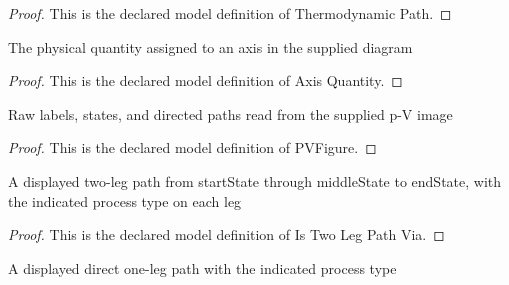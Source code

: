 \begin{proof}
  This is the declared model definition of Thermodynamic Path.
\end{proof}
\begin{definition}
  \label{def:physics:phyx-mini-0340:phyxminiproblems-problemphyxmini0340-axisquantity}
  The physical quantity assigned to an axis in the supplied diagram
\end{definition}
\begin{proof}
  This is the declared model definition of Axis Quantity.
\end{proof}
\begin{definition}[PVFigure]
  \label{def:physics:phyx-mini-0340:phyxminiproblems-problemphyxmini0340-pvfigure}
  Raw labels, states, and directed paths read from the supplied p-V image
\end{definition}
\begin{proof}
  This is the declared model definition of PVFigure.
\end{proof}
\begin{definition}
  \label{def:physics:phyx-mini-0340:phyxminiproblems-problemphyxmini0340-istwolegpathvia}
  A displayed two-leg path from startState through middleState to endState, with the indicated process type on each leg
\end{definition}
\begin{proof}
  This is the declared model definition of Is Two Leg Path Via.
\end{proof}
\begin{definition}
  \label{def:physics:phyx-mini-0340:phyxminiproblems-problemphyxmini0340-isonelegpath}
  A displayed direct one-leg path with the indicated process type
\end{definition}
